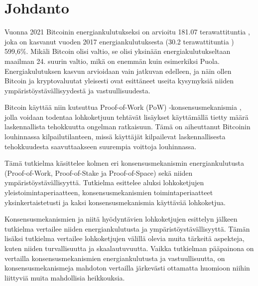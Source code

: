 \chapter{Johdanto\label{intro}}

Vuonna 2021 Bitcoinin energiankulutukseksi on arvioitu 181.07 terawattituntia \cite{bitcoinenergy}, joka on kasvanut vuoden 2017 energiankulutuksesta (30.2 terawattituntia \cite{bitcoinenergy1}) 599,6\%. Mikäli Bitcoin olisi valtio, se olisi yksinään energiakulutukseltaan maailman 24. suurin valtio, mikä on enemmän kuin esimerkiksi Puola. Energiakulutuksen kasvun arvioidaan vain jatkuvan edelleen, ja näin ollen Bitcoin ja kryptovaluutat yleisesti ovat esittäneet useita kysymyksiä niiden ympäristöystävällisyydestä ja vastuullisuudesta.

Bitcoin käyttää niin kutsuttua Proof-of-Work (PoW) -konsensusmekanismia \cite{satoshibitcoin}, jolla voidaan todentaa lohkoketjuun tehtävät lisäykset käyttämällä tietty määrä laskennallista tehokkuutta ongelman ratkaisuun. Tämä on aiheuttanut Bitcoinin louhinnassa kilpailutilanteen, missä käyttäjät kilpailevat laskennallisesta tehokkuudesta saavuttaakseen suurempia voittoja louhinnassa.

Tämä tutkielma käsittelee kolmen eri konsensusmekanismin energiankulutusta (Proof-of-Work, Proof-of-Stake ja Proof-of-Space) sekä niiden ympäristöystävällisyyttä. Tutkielma esittelee aluksi lohkoketjujen yleistoimintaperiaatteen, konsensusmekanismien toimintaperiaatteet yksinkertaistetusti ja kaksi konsensusmekanismia käyttävää lohkoketjua.

Konsensusmekanismien ja niitä hyödyntävien lohkoketjujen esittelyn jälkeen tutkielma vertailee niiden energiankulutusta ja ympäristöystävällisyyttä. Tämän lisäksi tutkielma vertailee lohkoketjujen välillä olevia muita tärkeitä aspekteja, kuten niiden turvallisuutta ja skaalautuvuutta. Vaikka tutkielman pääpainona on vertailla konsensusmekanismien energiankulutusta ja vastuullisuutta, on konsensusmekanismeja mahdoton vertailla järkevästi ottamatta huomioon niihin liittyviä muita mahdollisia heikkouksia.

